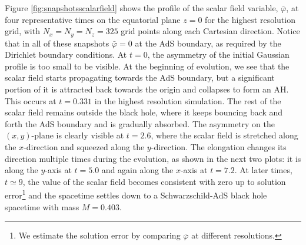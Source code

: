 \documentclass[aps,letterpaper,twocolumn,nofootinbib]{revtex4}
\numberwithin{equation}{section}
\begin{document}
Figure \ref{fig:snapshotsscalarfield} shows the profile of the scalar field variable, $\bar{\varphi}$, at four representative times on the equatorial plane $z=0$ for the highest resolution grid, with $N_x=N_y=N_z=325$ grid points along each Cartesian direction. Notice that in all of these snapshots $\bar{\varphi}=0$ at the AdS boundary, as required by the Dirichlet boundary conditions. At $t=0$, the asymmetry of the initial Gaussian profile is too small to be visible. At the beginning of evolution, we see that the scalar field starts propagating towards the AdS boundary, but a significant portion of it is attracted back towards the origin and collapses to form an AH. This occurs at $t=0.331$ in the highest resolution simulation. The rest of the scalar field remains outside the black hole, where it keeps bouncing back and forth the AdS boundary and is gradually absorbed.
The asymmetry on the $(x,y)$-plane is clearly visible at $t=2.6$, where the scalar field is stretched along the $x$-direction and squeezed along the $y$-direction. The elongation changes its direction multiple times during the evolution, as shown in the next two plots: it is along the $y$-axis at $t=5.0$ and again along the $x$-axis at $t=7.2$. 
At later times, $t\simeq 9$, the value of the scalar field becomes consistent with zero up to solution error\footnote{We estimate the solution error by comparing $\bar{\varphi}$ at different resolutions.} and the spacetime settles down to a Schwarzschild-AdS black hole spacetime with mass $M=0.403$.
\end{document}
